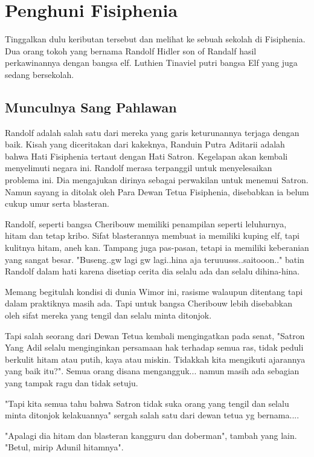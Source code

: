 \section{Penghuni Fisiphenia}
Tinggalkan dulu keributan tersebut dan melihat ke sebuah sekolah di 
Fisiphenia. 
Dua orang tokoh yang bernama Randolf Hidler son of Randalf hasil 
perkawinannya dengan bangsa elf. 
Luthien Tinaviel putri bangsa Elf yang juga sedang bersekolah.

\subsection{Munculnya Sang Pahlawan}

Randolf adalah salah satu dari mereka yang garis keturunannya 
terjaga dengan baik. 
Kisah yang diceritakan dari kakeknya, Randuin Putra Aditarii 
adalah bahwa Hati Fisiphenia tertaut dengan Hati Satron. 
Kegelapan akan kembali menyelimuti negara ini. 
Randolf merasa terpanggil untuk menyelesaikan problema ini. 
Dia mengajukan dirinya sebagai perwakilan untuk menemui Satron. 
Namun sayang ia ditolak oleh Para Dewan Tetua Fisiphenia, 
disebabkan ia belum cukup umur serta blasteran.

Randolf, seperti bangsa Cheribouw memiliki penampilan seperti 
leluhurnya, hitam dan tetap kribo. 
Sifat blasterannya membuat ia memiliki kuping elf, tapi kulitnya 
hitam, aneh kan. 
Tampang juga pas-pasan, tetapi ia memiliki keberanian yang 
sangat besar.
"Buseng..gw lagi gw lagi..hina aja teruuusss..saitooon.." 
batin Randolf dalam hati karena disetiap cerita dia selalu ada 
dan selalu dihina-hina.

Memang begitulah kondisi di dunia Wimor ini, rasisme walaupun 
ditentang tapi dalam praktiknya masih ada. 
Tapi untuk bangsa Cheribouw lebih disebabkan oleh sifat mereka 
yang tengil dan selalu minta ditonjok.

Tapi salah seorang dari Dewan Tetua kembali mengingatkan pada 
senat, "Satron Yang Adil selalu menginginkan persamaan hak terhadap 
semua ras, tidak peduli berkulit hitam atau putih, kaya atau miskin. 
Tidakkah kita mengikuti ajarannya yang baik itu?".
Semua orang disana mengangguk... namun masih ada sebagian yang 
tampak ragu dan tidak setuju.

"Tapi kita semua tahu bahwa Satron tidak suka orang yang tengil 
dan selalu minta ditonjok kelakuannya" sergah salah satu dari 
dewan tetua yg bernama....

"Apalagi dia hitam dan blasteran kangguru dan doberman", tambah 
yang lain. 
"Betul, mirip Adunil hitamnya". 

